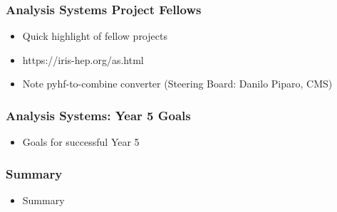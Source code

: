 \begin{frame}
\end{frame}

\begin{frame}
  \frametitle{Analysis Systems Project Fellows}

  \begin{itemize}
    \item Quick highlight of fellow projects
    \item https://iris-hep.org/as.html
    \item Note pyhf-to-combine converter (Steering Board: Danilo Piparo, CMS)
  \end{itemize}

\end{frame}

\begin{frame}
  \frametitle{Analysis Systems: Year 5 Goals}

  \begin{itemize}
    \item Goals for successful Year 5
  \end{itemize}

\end{frame}

\begin{frame}
  \frametitle{Summary}

  \begin{itemize}
    \item Summary
  \end{itemize}

\end{frame}
